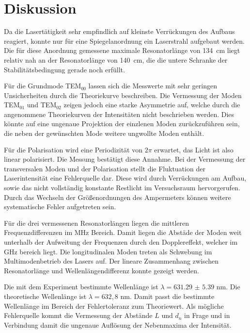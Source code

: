 \section{Diskussion}
\label{sec:Diskussion}

Da die Lasertätigkeit sehr empfindlich auf kleinste Verrückungen des Aufbaus reagiert, konnte nur für eine Spiegelanordnung ein Laserstrahl aufgebaut werden.
Die für diese Anordnung gemessene maximale Resonatorlänge von \SI{134}{\centi\meter} liegt relativ nah an der Resonatorlänge von \SI{140}{\centi\meter}, die die untere Schranke der Stabilitätsbedingung gerade noch erfüllt.

Für die Grundmode TEM$_{00}$ lassen sich die Messwerte mit sehr geringen Unsicherheiten durch  die Theoriekurve beschreiben.
Die Vermessung der Moden TEM$_{01}$ und TEM$_{02}$ zeigen jedoch eine starke Asymmetrie auf, welche durch die angenommene Theoriekurven der Intensitäten nicht beschrieben werden.
Dies könnte auf eine ungenaue Projektion der einzlenen Moden zurückzuführen sein, die neben der gewünschten Mode weitere ungwollte Moden enthält.

Für die Polarisation wird eine Periodizität von $2\pi$ erwartet, das Licht ist also linear polarisiert.
Die Messung bestätigt diese Annahme.
Bei der Vermessung der transversalen Moden und der Polarisation stellt die Fluktuation der Laserintensität eine Fehlerquelle dar.
Diese wird durch Verrückungen am Aufbau, sowie das nicht vollständig konstante Restlicht im Versuchsraum hervorgerufen.
Durch das Wechseln der Größenordnungen des Ampermeters können weitere systematische Fehler aufgetreten sein.

Für die drei vermessenen Resonatorlängen liegen die mittleren Frequenzdifferenzen im MHz Bereich.
Damit liegen die Abstäde der Moden weit unterhalb der Aufweitung der Frequenzen durch den Dopplereffekt, welcher im GHz bereich liegt.
Die longitudinalen Moden treten als Schwebung im Multimodenbetrieb des Lasers auf.
Der lineare Zusammenhang zwischen Resonatorlänge und Wellenlängendifferenz konnte gezeigt werden.

Die mit dem Experiment bestimmte Wellenlänge ist $\lambda = \num{631.29(539)}$ nm.
Die theoretische Wellenlänge ist $\lambda = 632,8$ nm.
Damit passt die bestimmte Wellenlänge im Bereich der Fehlertoleranz zum Theoriewert.
Als mögliche Fehlerquelle kommt die Vermessung der Abstände $L$ und $d_n$ in Frage und in Verbindung damit die ungenaue Auflösung der Nebenmaxima der Intensität.
